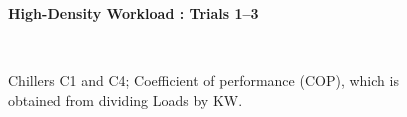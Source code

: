 \documentclass{report}
\begin{document}
\begin{figure}[!h]
\centerline{\bfseries\large High-Density Workload : Trials 1--3}\\
\caption{Chillers C1 and C4; Coefficient of performance (COP), which is obtained from dividing Loads by KW.}
\end{figure}
\end{document}
